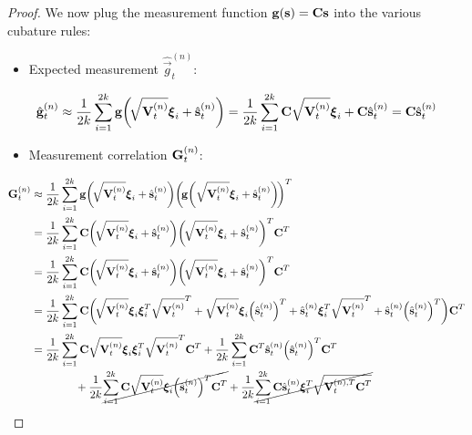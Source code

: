 \begin{proof}
			We now plug the measurement function \( \boldsymbol{\mathrm{g}}(\boldsymbol{\mathrm{s}}) = \boldsymbol{\mathrm{C}} \boldsymbol{\mathrm{s}} \) into the various cubature rules:
			\begin{itemize}
				\item Expected measurement \( \hat{\vec{g}}_t^{(n)} \):
			\end{itemize}
			\begin{align*}
				\hat{\boldsymbol{\mathrm{g}}}_t^{(n)}
					\approx \frac{1}{2k} \sum_{i = 1}^{2k} \boldsymbol{\mathrm{g}}\bigg(\!\sqrt{\boldsymbol{\mathrm{V}}_t^{(n)}} \boldsymbol{\mathrm{\xi}}_i + \hat{\boldsymbol{\mathrm{s}}}_t^{(n)}\bigg)
					= \frac{1}{2k} \sum_{i = 1}^{2k} \boldsymbol{\mathrm{C}} \sqrt{\boldsymbol{\mathrm{V}}_t^{(n)}} \boldsymbol{\mathrm{\xi}}_i + \boldsymbol{\mathrm{C}} \hat{\boldsymbol{\mathrm{s}}}_t^{(n)}
					= \boldsymbol{\mathrm{C}} \hat{\boldsymbol{\mathrm{s}}}_t^{(n)}
			\end{align*}
			\begin{itemize}
				\item Measurement correlation \( \boldsymbol{\mathrm{G}}_t^{(n)} \):
			\end{itemize}
			\begin{align*}
				\mat{G}_t^{(n)}
					&\approx \frac{1}{2k} \sum_{i = 1}^{2k} \vec{g}\bigg(\! \sqrt{\mat{V}_t^{(n)}} \vec{\xi}_i + \hat{\vec{s}}_t^{(n)}\bigg) \bigg(\!\vec{g}\bigg(\sqrt{\mat{V}_t^{(n)}} \vec{\xi}_i + \hat{\vec{s}}_t^{(n)}\bigg)\!\bigg)^T \\
					&= \frac{1}{2k} \sum_{i = 1}^{2k} \mat{C} \bigg(\! \sqrt{\mat{V}_t^{(n)}} \vec{\xi}_i + \hat{\vec{s}}_t^{(n)}\bigg) \bigg(\! \sqrt{\mat{V}_t^{(n)}} \vec{\xi}_i + \hat{\vec{s}}_t^{(n)}\bigg)^T \mat{C}^T \\
					&= \frac{1}{2k} \sum_{i = 1}^{2k} \mat{C} \bigg(\! \sqrt{\mat{V}_t^{(n)}} \vec{\xi}_i + \hat{\vec{s}}_t^{(n)}\bigg) \bigg(\! \sqrt{\mat{V}_t^{(n)}} \vec{\xi}_i + \hat{\vec{s}}_t^{(n)}\bigg)^T \mat{C}^T \\
					&= \frac{1}{2k} \sum_{i = 1}^{2k} \mat{C} \bigg(\! \sqrt{\mat{V}_t^{(n)}} \vec{\xi}_i \vec{\xi}_i^T \sqrt{\mat{V}_t^{(n)}}^T + \sqrt{\mat{V}_t^{(n)}} \vec{\xi}_i \Big(\hat{\vec{s}}_t^{(n)}\Big)^T + \hat{\vec{s}}_t^{(n)} \vec{\xi}_i^T \sqrt{\mat{V}_t^{(n)}}^T + \hat{\vec{s}}_t^{(n)} \Big(\hat{\vec{s}}_t^{(n)}\Big)^T \bigg) \mat{C}^T \\
					&= \frac{1}{2k} \sum_{i = 1}^{2k} \mat{C} \sqrt{\mat{V}_t^{(n)}} \vec{\xi}_i \vec{\xi}_i^T \sqrt{\mat{V}_t^{(n)}}^T \mat{C}^T + \frac{1}{2k} \sum_{i = 1}^{2k} \mat{C}^T \hat{\vec{s}}_t^{(n)} \Big(\hat{\vec{s}}_t^{(n)}\Big)^T \mat{C}^T \\
						&\qquad\qquad + \frac{1}{2k} \cancel{\sum_{i = 1}^{2k} \mat{C} \sqrt{\mat{V}_t^{(n)}} \vec{\xi}_i \Big(\hat{\vec{s}}_t^{(n)}\Big)^T \mat{C}^T} + \frac{1}{2k} \cancel{\sum_{i = 1}^{2k} \mat{C} \hat{\vec{s}}_t^{(n)} \vec{\xi}_i^T \sqrt{\mat{V}_t^{(n), T} \mat{C}^T}} \\

\end{align*}
\end{proof}
